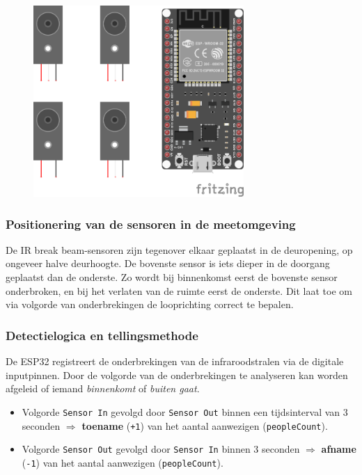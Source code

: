 \begin{figure}[htbp]
    \centering
    \includegraphics[width=8cm]{img/bp/wachtruimtes/technische_uitwerking/componenten.png}
    \label{fig:componenten}
\end{figure}

\subsubsection{Positionering van de sensoren in de meetomgeving}
De IR break beam-sensoren zijn tegenover elkaar geplaatst in de deuropening, op ongeveer halve deurhoogte. De bovenste sensor is iets dieper in de doorgang geplaatst dan de onderste. Zo wordt bij binnenkomst eerst de bovenste sensor onderbroken, en bij het verlaten van de ruimte eerst de onderste. Dit laat toe om via volgorde van onderbrekingen de looprichting correct te bepalen. %

\subsubsection{Detectielogica en tellingsmethode}
De ESP32 registreert de onderbrekingen van de infraroodstralen via de digitale inputpinnen. Door de volgorde van de onderbrekingen te analyseren kan worden afgeleid of iemand \textit{binnenkomt} of \textit{buiten gaat}.

\begin{itemize}
    \item Volgorde \texttt{Sensor In} gevolgd door \texttt{Sensor Out} binnen een tijdsinterval van 3 seconden $\Rightarrow$ \textbf{toename} (\texttt{+1}) van het aantal aanwezigen (\texttt{peopleCount}).
    \item Volgorde \texttt{Sensor Out} gevolgd door \texttt{Sensor In} binnen 3 seconden $\Rightarrow$ \textbf{afname} (\texttt{-1}) van het aantal aanwezigen (\texttt{peopleCount}).
\end{itemize}

